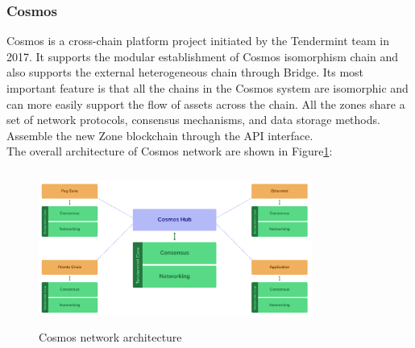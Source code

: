 \subsubsection{Cosmos}
\noindent Cosmos\cite{cosmos} is a cross-chain platform project initiated by the Tendermint team in 2017. It supports the modular establishment of Cosmos isomorphism chain and also supports the external heterogeneous chain through Bridge. Its most important feature is that all the chains in the Cosmos system are isomorphic and can more easily support the flow of assets across the chain. All the zones share a set of network protocols, consensus mechanisms, and data storage methods. Assemble the new Zone blockchain through the API interface.\\
\noindent The overall architecture of Cosmos network are shown in Figure\ref{fig:cosmos}:

        \begin{figure}[H]
        \includegraphics[width=0.8\textwidth, height=2in]{./figures/cosmos.png}
        \centering
        \caption{Cosmos network architecture\protect\footnotemark[1]}
        \centering
        \label{fig:cosmos}
        \end{figure}
        
